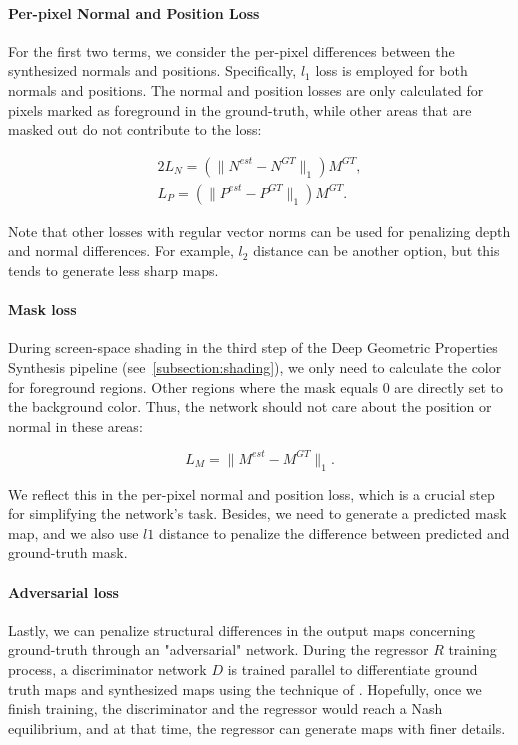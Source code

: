 \documentclass[journal]{vgtc}                %
\begin{document}
\paragraph{Per-pixel Normal and Position Loss}

For the first two terms, we consider the per-pixel differences between the synthesized normals and positions. Specifically, $l_1$ loss is employed for both normals and positions. The normal and position losses are only  calculated for pixels marked as foreground in the ground-truth, while other areas that are masked out do not contribute to the loss: 

\begin{alignat}{2}
L_{N} = (\|N^{est} - N^{GT}\|_1) M^{GT}, \\ 
L_{P} = (\|P^{est} - P^{GT}\|_1) M^{GT}.
\end{alignat}

Note that other losses with regular vector norms can be used for penalizing depth and normal differences. For example, $l_2$ distance can be another option, but this tends to generate less sharp maps. 

\paragraph{Mask loss}
During screen-space shading in the third step of the Deep Geometric Properties Synthesis pipeline (see~\ref{subsection:shading}), we only need to calculate the color for foreground regions. Other regions where the mask equals 0 are directly set to the background color. Thus, the network should not care about the position or normal in these areas:

\begin{equation}
L_{M} = \|M^{est} - M^{GT}\|_1.
\end{equation}

We reflect this in the per-pixel normal and position loss, which is a crucial step for simplifying the network's task. Besides, we need to generate a predicted mask map, and we also use $l1$ distance to penalize the difference between predicted and ground-truth mask. 

\paragraph{Adversarial loss}
Lastly, we can penalize structural differences in the output maps concerning ground-truth through an "adversarial" network. During the regressor $R$ training process, a discriminator network $D$ is trained parallel to differentiate ground truth maps and synthesized maps using the technique of \cite{goodfellow2014generative}. Hopefully, once we finish training, the discriminator and the regressor would reach a Nash equilibrium, and at that time, the regressor can generate maps with finer details. 
\end{document}
